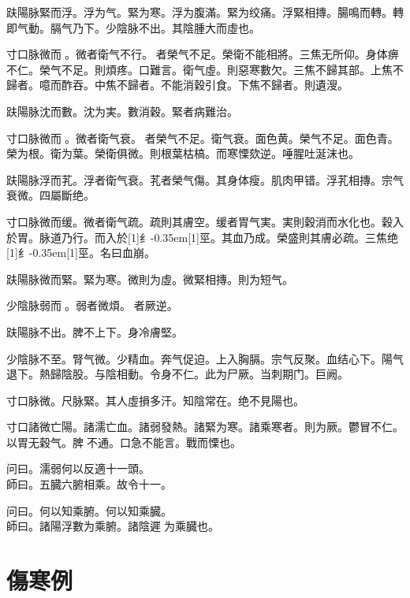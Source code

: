 \documentclass[oneside,b4paper]{ctexbook}
\begin{document}
\begin{flushleft}
趺陽脉緊而浮。浮为气。緊为寒。浮为腹滿。緊为绞痛。浮緊相摶。腸鳴而轉。轉即气動。膈气乃下。少陰脉不出。其陰腫大而虛也。

寸口脉微而{𬈧}。微者衛气不行。{𬈧}者榮气不足。榮衛不能相將。三焦无所仰。身体痹不仁。榮气不足。則煩疼。口難言。衛气虛。則惡寒數欠。三焦不歸其部。上焦不歸者。噫而酢吞。中焦不歸者。不能消穀引食。下焦不歸者。則遺溲。

趺陽脉沈而數。沈为実。數消穀。緊者病難治。

寸口脉微而{𬈧}。微者衛气衰。{𬈧}者榮气不足。衛气衰。面色黄。榮气不足。面色青。榮为根。衛为葉。榮衛俱微。則根葉枯槁。而寒慄欬逆。唾腥吐涎沫也。

趺陽脉浮而芤。浮者衛气衰。芤者榮气傷。其身体瘦。肌肉甲错。浮芤相摶。宗气衰微。四屬斷绝。

寸口脉微而缓。微者衛气疏。疏則其膚空。缓者胃气実。実則穀消而水化也。穀入於胃。脉道乃行。而入於{\hbox{\scalebox{0.68}[1]{纟}\kern-0.35em\scalebox{0.64}[1]{巠}}}。其血乃成。榮盛則其膚必疏。三焦绝{\hbox{\scalebox{0.68}[1]{纟}\kern-0.35em\scalebox{0.64}[1]{巠}}}。名曰血崩。

趺陽脉微而緊。緊为寒。微則为虛。微緊相摶。則为短气。

少陰脉弱而{𬈧}。弱者微煩。{𬈧}者厥逆。

趺陽脉不出。脾不上下。身冷膚堅。

少陰脉不至。腎气微。少精血。奔气促迫。上入胸膈。宗气反聚。血结心下。陽气退下。熱歸陰股。与陰相動。令身不仁。此为尸厥。当刺期门。巨阙。

寸口脉微。尺脉緊。其人虛損多汗。知陰常在。绝不見陽也。

寸口諸微亡陽。諸濡亡血。諸弱發熱。諸緊为寒。諸乘寒者。則为厥。鬱冒不仁。以胃无穀气。脾{𬈧}不通。口急不能言。戰而慄也。

问曰。濡弱何以反適十一頭。\\
師曰。五臓六腑相乘。故令十一。

问曰。何以知乘腑。何以知乘臓。\\
師曰。諸陽浮數为乘腑。諸陰遲{𬈧}为乘臓也。

\chapter{傷寒例}


\end{flushleft}
\end{document}
